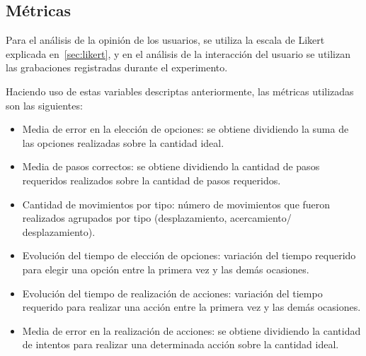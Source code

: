 \subsection{Métricas}

Para el análisis de la opinión de los usuarios, se utiliza la escala de Likert
explicada en~\ref{sec:likert}, y en el análisis de la interacción del usuario se
utilizan las grabaciones registradas durante el experimento.

Haciendo uso de estas variables descriptas anteriormente, las métricas
utilizadas son las siguientes:

\begin{itemize}
    
\item Media de error en la elección de opciones: se obtiene dividiendo la suma
    de las opciones realizadas sobre la cantidad ideal. 
    
\item Media de pasos correctos: se obtiene dividiendo la cantidad de pasos
    requeridos realizados sobre la cantidad de pasos requeridos. 
    
\item Cantidad de movimientos por tipo: número de movimientos que fueron
    realizados agrupados por tipo (desplazamiento, acercamiento/
    desplazamiento).
    
\item Evolución del tiempo de elección de opciones: variación del tiempo
    requerido para elegir una opción entre la primera vez y las demás ocasiones.
    
\item Evolución del tiempo de realización de acciones: variación del tiempo
    requerido para realizar una acción entre la primera vez y las demás
    ocasiones.
    
\item Media de error en la realización de acciones: se obtiene dividiendo la
    cantidad de intentos para realizar una determinada acción sobre la cantidad
    ideal.

\end{itemize}

